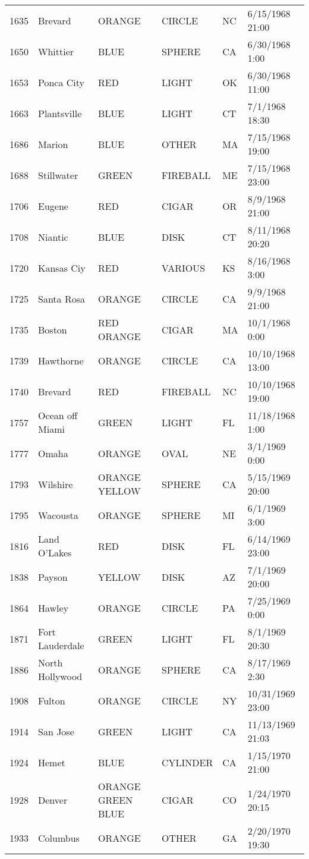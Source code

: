 \begin{tabular}{llllll}
1635 & Brevard & ORANGE & CIRCLE & NC & 6/15/1968 21:00 \\
1650 & Whittier & BLUE & SPHERE & CA & 6/30/1968 1:00 \\
1653 & Ponca City & RED & LIGHT & OK & 6/30/1968 11:00 \\
1663 & Plantsville & BLUE & LIGHT & CT & 7/1/1968 18:30 \\
1686 & Marion & BLUE & OTHER & MA & 7/15/1968 19:00 \\
1688 & Stillwater & GREEN & FIREBALL & ME & 7/15/1968 23:00 \\
1706 & Eugene & RED & CIGAR & OR & 8/9/1968 21:00 \\
1708 & Niantic & BLUE & DISK & CT & 8/11/1968 20:20 \\
1720 & Kansas Ciy & RED & VARIOUS & KS & 8/16/1968 3:00 \\
1725 & Santa Rosa & ORANGE & CIRCLE & CA & 9/9/1968 21:00 \\
1735 & Boston & RED ORANGE & CIGAR & MA & 10/1/1968 0:00 \\
1739 & Hawthorne & ORANGE & CIRCLE & CA & 10/10/1968 13:00 \\
1740 & Brevard & RED & FIREBALL & NC & 10/10/1968 19:00 \\
1757 & Ocean off Miami & GREEN & LIGHT & FL & 11/18/1968 1:00 \\
1777 & Omaha & ORANGE & OVAL & NE & 3/1/1969 0:00 \\
1793 & Wilshire & ORANGE YELLOW & SPHERE & CA & 5/15/1969 20:00 \\
1795 & Wacousta & ORANGE & SPHERE & MI & 6/1/1969 3:00 \\
1816 & Land O'Lakes & RED & DISK & FL & 6/14/1969 23:00 \\
1838 & Payson & YELLOW & DISK & AZ & 7/1/1969 20:00 \\
1864 & Hawley & ORANGE & CIRCLE & PA & 7/25/1969 0:00 \\
1871 & Fort Lauderdale & GREEN & LIGHT & FL & 8/1/1969 20:30 \\
1886 & North Hollywood & ORANGE & SPHERE & CA & 8/17/1969 2:30 \\
1908 & Fulton & ORANGE & CIRCLE & NY & 10/31/1969 23:00 \\
1914 & San Jose & GREEN & LIGHT & CA & 11/13/1969 21:03 \\
1924 & Hemet & BLUE & CYLINDER & CA & 1/15/1970 21:00 \\
1928 & Denver & ORANGE GREEN BLUE & CIGAR & CO & 1/24/1970 20:15 \\
1933 & Columbus & ORANGE & OTHER & GA & 2/20/1970 19:30 \\

\end{tabular}
